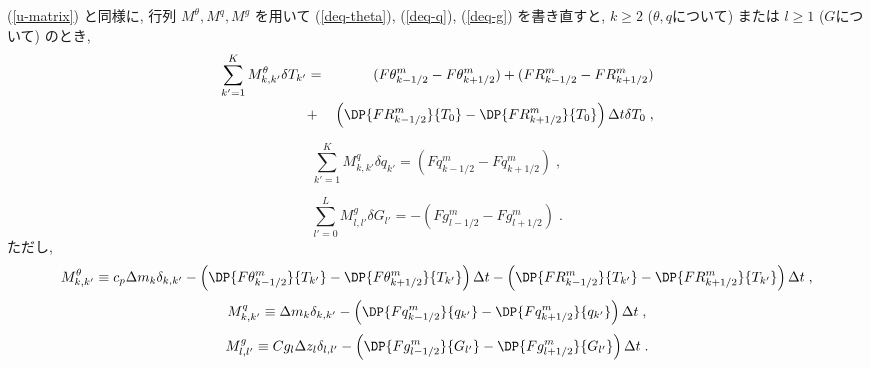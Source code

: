 (\ref{u-matrix}) と同様に, 行列 $M^{\theta}, M^q, M^g$ を用いて
(\ref{deq-theta}), (\ref{deq-q}), (\ref{deq-g}) を書き直すと, 
%
 $k \ge 2$ ($\theta, q$について) または $l \ge 1$ ($G$について) のとき, 
%
  \begin{eqnarray}
    \sum_{k'=1}^{K}  M^\theta_{k,k'} \delta T_{k'}
       & = & (F\theta^{m}_{k-1/2} - F\theta^{m}_{k+1/2}) 
        + (FR^{m}_{k-1/2} - FR^{m}_{k+1/2})  \nonumber \\
& + & \left(\DP{FR^{m}_{k-1/2}}{T_0} - \DP{FR^{m}_{k+1/2}}{T_0} \right)
     \Delta t\delta T_0 \; ,
  \label{comb-theta2}
  \end{eqnarray}

\begin{equation}
 \sum_{k'=1}^{K}  M^q_{k,k'} \delta q_{k'}
         = (Fq^{m}_{k-1/2} - Fq^{m}_{k+1/2}) \; ,
  \label{comb-q2}
\end{equation}

\begin{equation}
  \sum_{l'=0}^{L} M^g_{l,l'} \delta G_{l'}
         = - (Fg^{m}_{l-1/2} - Fg^{m}_{l+1/2}) \; .
  \label{comb-g2}
\end{equation}
%
ただし, 
\begin{equation}
M^{\theta}_{k,k'} \equiv c_p \Delta m_k \delta_{k,k'}
          -  \left(  \DP{F\theta^{m}_{k-1/2}}{T_{k'}} 
                   - \DP{F\theta^{m}_{k+1/2}}{T_{k'}} \right) \Delta t
          -  \left(  \DP{FR^{m}_{k-1/2}}{T_{k'}} 
                   - \DP{FR^{m}_{k+1/2}}{T_{k'}} \right) \Delta t \; , 
\end{equation}
\begin{equation}
M^{q}_{k,k'} \equiv \Delta m_k \delta_{k,k'}
          -  \left(  \DP{Fq^{m}_{k-1/2}}{q_{k'}} 
                   - \DP{Fq^{m}_{k+1/2}}{q_{k'}} \right) \Delta t \; ,
\end{equation}
\begin{equation}
M^{g}_{l,l'} \equiv Cg_l \Delta z_l \delta_{l,l'}
          -  \left(  \DP{Fg^{m}_{l-1/2}}{G_{l'}} 
                   - \DP{Fg^{m}_{l+1/2}}{G_{l'}} \right) \Delta t \; .
\end{equation}

